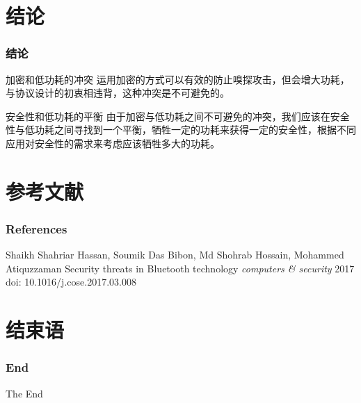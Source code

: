 \documentclass[UTF8]{ctexbeamer}
\begin{document}
\section{结论}

\begin{frame}
  \frametitle{结论}
  \begin{block}{加密和低功耗的冲突}
    运用加密的方式可以有效的防止嗅探攻击，但会增大功耗，与协议设计的初衷相违背，这种冲突是不可避免的。
  \end{block}
  \begin{alertblock}{安全性和低功耗的平衡}
    由于加密与低功耗之间不可避免的冲突，我们应该在安全性与低功耗之间寻找到一个平衡，牺牲一定的功耗来获得一定的安全性，根据不同应用对安全性的需求来考虑应该牺牲多大的功耗。
  \end{alertblock}
\end{frame}

  
\section{参考文献}
\begin{frame}
\frametitle{References}
\footnotesize{
\begin{thebibliography}{99}
 Shaikh Shahriar Hassan, Soumik Das Bibon, Md Shohrab Hossain, Mohammed Atiquzzaman
\newblock Security threats in Bluetooth technology
\newblock \emph{computers \& security} 2017 doi: 10.1016/j.cose.2017.03.008
\end{thebibliography}
}
\end{frame}

\section{结束语}

\begin{frame}
  \frametitle{End}
\Huge{\centerline{The End}}
\end{frame}
\end{document}
